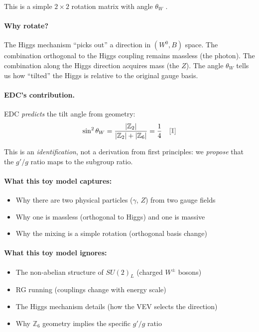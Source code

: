 This is a simple $2 \times 2$ rotation matrix with angle $\theta_W$ \tagM{}.

\paragraph{Why rotate?}
The Higgs mechanism ``picks out'' a direction in $(W^0, B)$ space. The combination
orthogonal to the Higgs coupling remains massless (the photon). The combination
along the Higgs direction acquires mass (the $Z$). The angle $\theta_W$ tells us
how ``tilted'' the Higgs is relative to the original gauge basis.

\paragraph{EDC's contribution.}
EDC \emph{predicts} the tilt angle from geometry:
\[
    \sin^2\theta_W = \frac{|\mathbb{Z}_2|}{|\mathbb{Z}_2| + |\mathbb{Z}_6|} = \frac{1}{4}
    \quad \tagI{}
\]

This is an \emph{identification}, not a derivation from first principles: we
\emph{propose} that the $g'/g$ ratio maps to the subgroup ratio.

\paragraph{What this toy model captures:}
\begin{itemize}[nosep]
    \item[\ding{51}] Why there are two physical particles ($\gamma$, $Z$) from two gauge fields
    \item[\ding{51}] Why one is massless (orthogonal to Higgs) and one is massive
    \item[\ding{51}] Why the mixing is a simple rotation (orthogonal basis change)
\end{itemize}

\paragraph{What this toy model ignores:}
\begin{itemize}[nosep]
    \item[$\times$] The non-abelian structure of $SU(2)_L$ (charged $W^\pm$ bosons)
    \item[$\times$] RG running (couplings change with energy scale)
    \item[$\times$] The Higgs mechanism details (how the VEV selects the direction)
    \item[$\times$] Why $\mathbb{Z}_6$ geometry implies the specific $g'/g$ ratio
\end{itemize}

